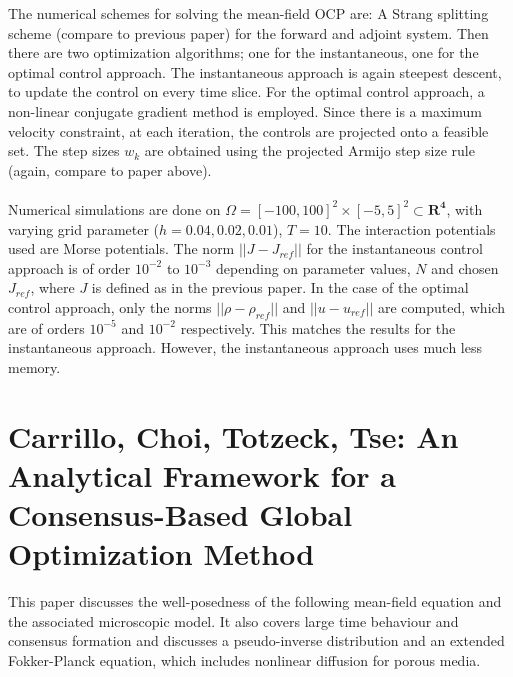 \documentclass[11pt, a4paper]{article}
\theoremstyle{definition}
\begin{document}
The numerical schemes for solving the mean-field OCP are: A Strang splitting scheme (compare to previous paper) for the forward and adjoint system. Then there are two optimization algorithms; one for the instantaneous, one for the optimal control approach.
The instantaneous approach is again steepest descent, to update the control on every time slice.
For the optimal control approach, a non-linear conjugate gradient method is employed. Since there is a maximum velocity constraint, at each iteration, the controls are projected onto a feasible set. The step sizes $w_k$ are obtained using the projected Armijo step size rule (again, compare to paper above).
\\
\\
Numerical simulations are done on $\Omega=[-100,100]^2 \times [-5,5]^2 \subset \mathbf{R^4}$, with varying grid parameter ($h=0.04,0.02,0.01$), $T=10$. The interaction potentials used are Morse potentials.
The norm $||J -J_{ref}||$ for the instantaneous control approach is of order $10 ^{-2}$ to $10^{-3}$ depending on parameter values, $N$ and chosen $J_{ref}$, where $J$ is defined as in the previous paper. In the case of the optimal control approach, only the norms $||\rho-\rho_{ref}||$ and $|| u-u_{ref}||$ are computed, which are of orders $10^{-5}$ and $10^{-2}$ respectively. This matches the results for the instantaneous approach. However, the instantaneous approach uses much less memory.



\section{Carrillo, Choi, Totzeck, Tse: An Analytical Framework for a Consensus-Based Global Optimization Method \cite{carrillo2018no1}}
This paper discusses the well-posedness of the following mean-field equation and the associated microscopic model. It also covers large time behaviour and consensus formation and discusses a pseudo-inverse distribution and an extended Fokker-Planck equation, which includes nonlinear diffusion for porous media.
\end{document}
